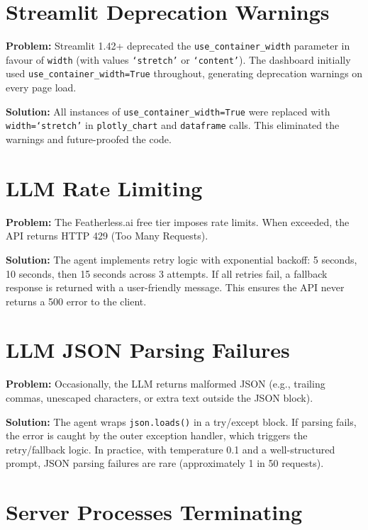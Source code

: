 \documentclass[12pt, a4paper]{report}
\begin{document}
\section{Streamlit Deprecation Warnings}

\textbf{Problem:} Streamlit 1.42+ deprecated the \texttt{use\_container\_width} parameter in favour of \texttt{width} (with values \texttt{`stretch'} or \texttt{`content'}). The dashboard initially used \texttt{use\_container\_width=True} throughout, generating deprecation warnings on every page load.

\textbf{Solution:} All instances of \texttt{use\_container\_width=True} were replaced with \texttt{width=`stretch'} in \texttt{plotly\_chart} and \texttt{dataframe} calls. This eliminated the warnings and future-proofed the code.

\section{LLM Rate Limiting}

\textbf{Problem:} The Featherless.ai free tier imposes rate limits. When exceeded, the API returns HTTP 429 (Too Many Requests).

\textbf{Solution:} The agent implements retry logic with exponential backoff: 5 seconds, 10 seconds, then 15 seconds across 3 attempts. If all retries fail, a fallback response is returned with a user-friendly message. This ensures the API never returns a 500 error to the client.

\section{LLM JSON Parsing Failures}

\textbf{Problem:} Occasionally, the LLM returns malformed JSON (e.g., trailing commas, unescaped characters, or extra text outside the JSON block).

\textbf{Solution:} The agent wraps \texttt{json.loads()} in a try/except block. If parsing fails, the error is caught by the outer exception handler, which triggers the retry/fallback logic. In practice, with temperature 0.1 and a well-structured prompt, JSON parsing failures are rare (approximately 1 in 50 requests).

\section{Server Processes Terminating}
\end{document}
